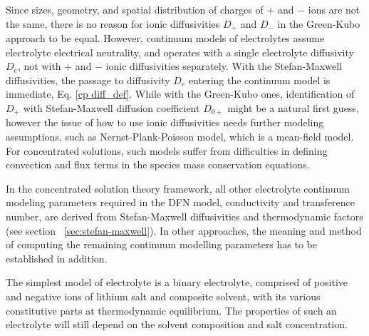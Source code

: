 \documentclass[../main.tex]{subfiles}
\begin{document}
Since sizes, geometry, and spatial distribution of charges of $+$ and $-$ ions are not the same, there is no reason for ionic diffusivities $D_+$ and $D_-$ in the Green-Kubo approach to be equal. However, continuum models of electrolytes assume electrolyte electrical neutrality, and operates with a single electrolyte diffusivity $D_e$, not with $+$ and $-$ ionic diffusivities separately. With the Stefan-Maxwell diffusivities, the passage to diffusivity $D_e$ entering the continuum model is immediate, Eq. \ref{cp diff_def}. While with the Green-Kubo ones, identification of $D_+$ with Stefan-Maxwell diffusion coefficient $D_{0+}$  might be a natural first guess, however the issue of how to use ionic diffusivities needs further modeling assumptions, such as Nernst-Plank-Poisson model, which is a mean-field model. For concentrated solutions, such models suffer from difficulties in defining convection and flux terms in the species mass conservation equations.

In the concentrated solution theory framework, all other electrolyte continuum modeling parameters required in the DFN model, conductivity and transference number, are derived from Stefan-Maxwell diffusivities and thermodynamic factors  (see section ~\ref{sec:stefan-maxwell}). In other approaches, the meaning and method of computing the remaining continuum modelling parameters has to be established in addition.



The simplest model of electrolyte is a binary electrolyte, comprised of positive and negative ions of lithium salt and composite solvent, with its various constitutive parts at thermodynamic equilibrium. The properties of such an electrolyte will still depend on the solvent composition and salt concentration.
\end{document}
